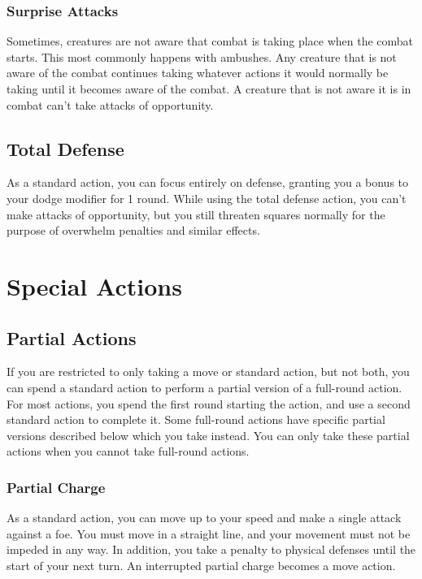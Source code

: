 \subsubsection{Surprise Attacks}\label{Surprise Attacks}
Sometimes, creatures are not aware that combat is taking place when the combat starts. This most commonly happens with ambushes. Any creature that is not aware of the combat continues taking whatever actions it would normally be taking until it becomes aware of the combat. A creature that is not aware it is in combat can't take attacks of opportunity.

\subsection{Total Defense}\label{Total Defense}
As a standard action, you can focus entirely on defense, granting you a  bonus to your dodge modifier for 1 round. While using the total defense action, you can't make attacks of opportunity, but you still threaten squares normally for the purpose of overwhelm penalties and similar effects.

\section{Special Actions}

\subsection{Partial Actions}

If you are restricted to only taking a move or standard action, but not both, you can spend a standard action to perform a partial version of a full-round action. For most actions, you spend the first round starting the action, and use a second standard action to complete it. Some full-round actions have specific partial versions described below which you take instead. You can only take these partial actions when you cannot take full-round actions. 

\subsubsection{Partial Charge}
As a standard action, you can move up to your speed and make a single attack against a foe. You must move in a straight line, and your movement must not be impeded in any way. In addition, you take a  penalty to physical defenses until the start of your next turn. An interrupted partial charge becomes a move action.

